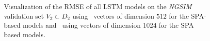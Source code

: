 \begin{figure}[t!]
	\centering

    \caption{Visualization of the \ac{RMSE} of all \ac{LSTM} models on the \emph{\ac{NGSIM}} validation set $V_2 \subset D_2$ using~\protect{} vectors of dimension $512$ for the \ac{SPA}-based models and~\protect{} using vectors of dimension $1024$ for the \ac{SPA}-based models.}\label{fig:rmse_ngsim_all}

\end{figure}


